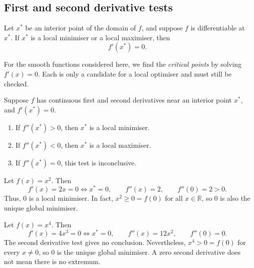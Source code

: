 \subsection{First and second derivative tests}

\begin{theorem}\label{thm:first-order-necessary-condition}
	Let $x^*$ be an interior point of the domain of $f$, and suppose $f$ is differentiable at $x^*$. If $x^*$ is a local minimiser or a local maximiser, then
	\begin{equation}
		f'(x^*)=0.
		\label{eq:lec04-stationary}
	\end{equation}
\end{theorem}

For the smooth functions considered here, we find the \emph{critical points} by solving $f'(x)=0$. Each is only a candidate for a local optimiser and must still be checked.

\begin{theorem}\label{thm:second-derivative-test}
	Suppose $f$ has continuous first and second derivatives near an interior point $x^*$, and $f'(x^*)=0$.
	\begin{enumerate}
		\item If $f''(x^*)>0$, then $x^*$ is a local minimiser.
		\item If $f''(x^*)<0$, then $x^*$ is a local maximiser.
		\item If $f''(x^*)=0$, this test is inconclusive.
	\end{enumerate}
\end{theorem}

\begin{example}
	Let $f(x)=x^2$. Then
	\[
		f'(x)=2x=0\iff x^*=0,
		\qquad f''(x)=2,
		\qquad f''(0)=2>0.
	\]
	Thus, $0$ is a local minimiser. In fact, $x^2\geq0=f(0)$ for all $x\in\mathbb{R}$, so $0$ is also the unique global minimiser.
\end{example}

\begin{example}
	Let $f(x)=x^4$. Then
	\[
		f'(x)=4x^3=0\iff x^*=0,
		\qquad f''(x)=12x^2,
		\qquad f''(0)=0.
	\]
	The second derivative test gives no conclusion. Nevertheless, $x^4>0=f(0)$ for every $x\neq0$, so $0$ is the unique global minimiser. A zero second derivative does not mean there is no extremum.
\end{example}

